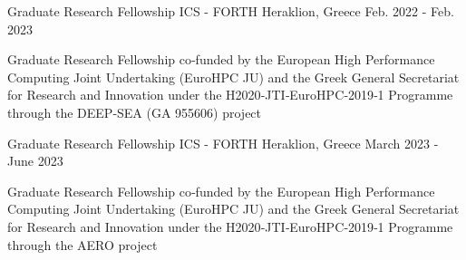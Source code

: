 

\begin{cventries}


  \cventry
    {Graduate Research Fellowship} %
    {ICS - FORTH} %
    {Heraklion, Greece} %
    {Feb. 2022 - Feb. 2023} %
    {
      \begin{cvitems} %
          \item{Graduate Research Fellowship co‐funded  by  the  European  High  Performance  Computing  Joint  Undertaking 
	(EuroHPC  JU)  and  the  Greek  General  Secretariat  for  Research  and  Innovation under the H2020‐JTI‐EuroHPC‐2019‐1 Programme through the
          DEEP‐SEA (GA 955606) project}
      \end{cvitems}
    }

  \cventry
    {Graduate Research Fellowship} %
    {ICS - FORTH} %
    {Heraklion, Greece} %
    {March 2023 - June 2023} %
    {
      \begin{cvitems} %
          \item{Graduate Research Fellowship co‐funded  by  the  European  High  Performance  Computing  Joint  Undertaking 
	(EuroHPC  JU)  and  the  Greek  General  Secretariat  for  Research  and  Innovation under the H2020‐JTI‐EuroHPC‐2019‐1 Programme through the
          AERO project}
      \end{cvitems}
    }

\end{cventries}
